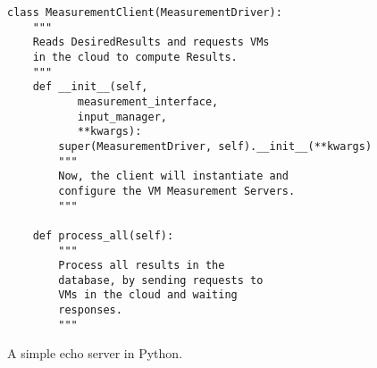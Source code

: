 \begin{listing}[htpb]
    \begin{verbatim}
class MeasurementClient(MeasurementDriver):
    """
    Reads DesiredResults and requests VMs
    in the cloud to compute Results.
    """
    def __init__(self,
           measurement_interface,
           input_manager,
           **kwargs):
        super(MeasurementDriver, self).__init__(**kwargs)
        """
        Now, the client will instantiate and 
        configure the VM Measurement Servers.
        """

    def process_all(self):
        """
        Process all results in the
        database, by sending requests to
        VMs in the cloud and waiting
        responses.
        """
    \end{verbatim}
    \caption{A simple echo server in Python.}
    \label{fig:measurement-client}
\end{listing}
